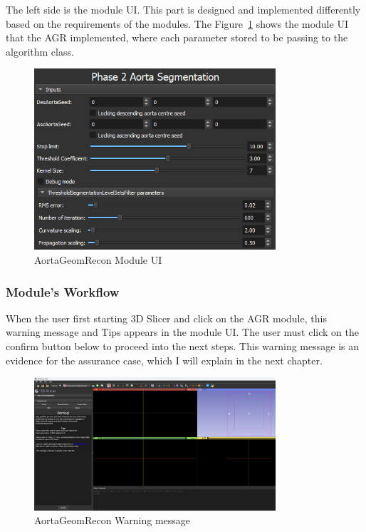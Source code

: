 The left side is the module UI. This part is designed and implemented differently based on the requirements of the modules. The Figure~\ref{fig_module_ui} shows the module UI that the AGR implemented, where each parameter stored to be passing to the algorithm class.

\begin{figure}[H]
    \centering
    \includegraphics[width=0.8\textwidth]{figures/AGR/Module_UI.png}
    \caption[AortaGeomRecon Module UI]{AortaGeomRecon Module UI}
    \label{fig_module_ui}
\end{figure}


\subsubsection{Module's Workflow}
When the user first starting 3D Slicer and click on the AGR module, this warning message and Tips appears in the module UI. The user must click on the confirm button below to proceed into the next steps. This warning message is an evidence for the assurance case, which I will explain in the next chapter.

\begin{figure}[H]
    \centering
    \includegraphics[width=0.8\textwidth]{figures/AGR/AGR_warning.png}
    \caption[AortaGeomRecon Warning message]{AortaGeomRecon Warning message}
    \label{fig_agr_warning}
\end{figure}

